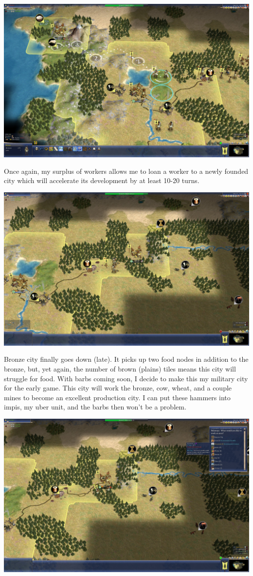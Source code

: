 \documentclass[10pt]{article}
\begin{document}
\includegraphics[width=1.0\textwidth]{26}

Once again, my surplus of workers allows me to loan a worker to a newly founded city which will accelerate
its development by at least 10-20 turns.

\includegraphics[width=1.0\textwidth]{27}

Bronze city finally goes down (late). It picks up two food nodes in addition to the bronze, but, yet again,
the number of brown (plains) tiles means this city will struggle for food. With barbs coming soon, I decide
to make this my military city for the early game. This city will work the bronze, cow, wheat, and a couple
mines to become an excellent production city. I can put these hammers into impis, my uber unit, and the barbs
then won't be a problem.

\includegraphics[width=1.0\textwidth]{30}
\end{document}
